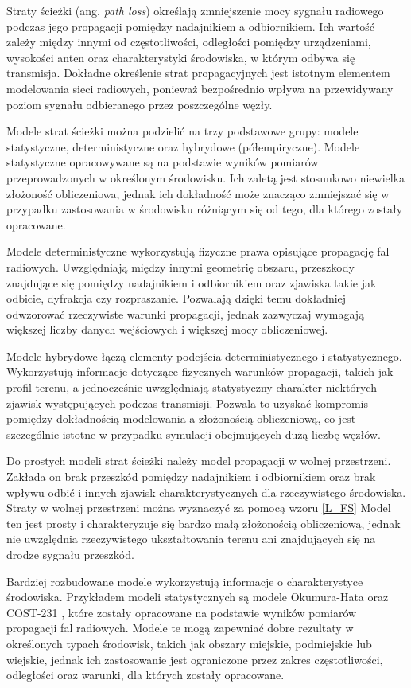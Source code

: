 \documentclass[12pt,a4paper,twoside]{report}
\theoremstyle{definition} %
\begin{document}
Straty ścieżki (ang. \textit{path loss}) określają zmniejszenie mocy sygnału radiowego podczas jego propagacji pomiędzy nadajnikiem a odbiornikiem. Ich wartość zależy między innymi od częstotliwości, odległości pomiędzy urządzeniami, wysokości anten oraz charakterystyki środowiska, w którym odbywa się transmisja. Dokładne określenie strat propagacyjnych jest istotnym elementem modelowania sieci radiowych, ponieważ bezpośrednio wpływa na przewidywany poziom sygnału odbieranego przez poszczególne węzły.

Modele strat ścieżki można podzielić na trzy podstawowe grupy: modele statystyczne, deterministyczne oraz hybrydowe (półempiryczne). Modele statystyczne opracowywane są na podstawie wyników pomiarów przeprowadzonych w określonym środowisku. Ich zaletą jest stosunkowo niewielka złożoność obliczeniowa, jednak ich dokładność może znacząco zmniejszać się w przypadku zastosowania w środowisku różniącym się od tego, dla którego zostały opracowane.

Modele deterministyczne wykorzystują fizyczne prawa opisujące propagację fal radiowych. Uwzględniają między innymi geometrię obszaru, przeszkody znajdujące się pomiędzy nadajnikiem i odbiornikiem oraz zjawiska takie jak odbicie, dyfrakcja czy rozpraszanie. Pozwalają dzięki temu dokładniej odwzorować rzeczywiste warunki propagacji, jednak zazwyczaj wymagają większej liczby danych wejściowych i większej mocy obliczeniowej.

Modele hybrydowe łączą elementy podejścia deterministycznego i statystycznego. Wykorzystują informacje dotyczące fizycznych warunków propagacji, takich jak profil terenu, a jednocześnie uwzględniają statystyczny charakter niektórych zjawisk występujących podczas transmisji. Pozwala to uzyskać kompromis pomiędzy dokładnością modelowania a złożonością obliczeniową, co jest szczególnie istotne w przypadku symulacji obejmujących dużą liczbę węzłów.

Do prostych modeli strat ścieżki należy model propagacji w wolnej przestrzeni. Zakłada on brak przeszkód pomiędzy nadajnikiem i odbiornikiem oraz brak wpływu odbić i innych zjawisk charakterystycznych dla rzeczywistego środowiska. Straty w wolnej przestrzeni można wyznaczyć za pomocą wzoru \eqref{L_FS} Model ten jest prosty i charakteryzuje się bardzo małą złożonością obliczeniową, jednak nie uwzględnia rzeczywistego ukształtowania terenu ani znajdujących się na drodze sygnału przeszkód.

Bardziej rozbudowane modele wykorzystują informacje o charakterystyce środowiska. Przykładem modeli statystycznych są modele Okumura-Hata \cite{okumura1968,hata1980} oraz COST-231 \cite{cost231}, które zostały opracowane na podstawie wyników pomiarów propagacji fal radiowych. Modele te mogą zapewniać dobre rezultaty w określonych typach środowisk, takich jak obszary miejskie, podmiejskie lub wiejskie, jednak ich zastosowanie jest ograniczone przez zakres częstotliwości, odległości oraz warunki, dla których zostały opracowane.
\end{document}
